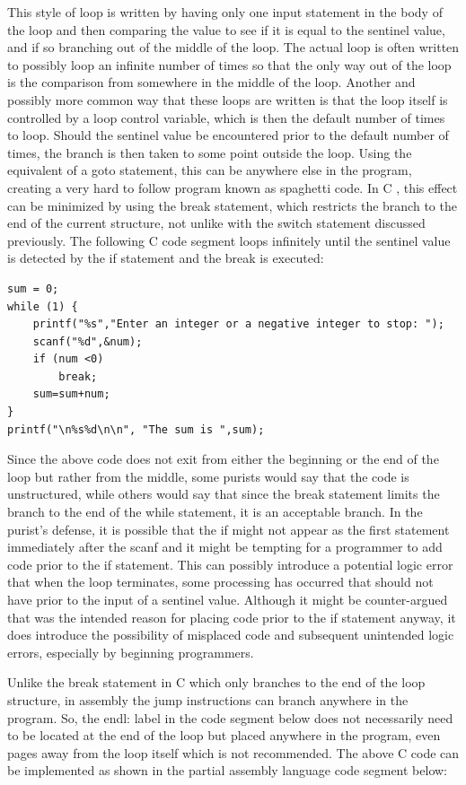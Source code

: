 \documentclass[10pt]{book}
\begin{document}
This style of loop is written by having only one input statement in the body of the loop and then comparing the value to see if it is equal to the sentinel value, and if so branching out of the middle of the loop. The actual loop is often written to possibly loop an infinite number of times so that the only way out of the loop is the comparison from somewhere in the middle of the loop. Another and possibly more common way that these loops are written is that the loop itself is controlled by a loop control variable, which is then the default number of times to loop. Should the sentinel value be encountered prior to the default number of times, the branch is then taken to some point outside the loop. Using the equivalent of a goto statement, this can be anywhere else in the program, creating a very hard to follow program known as spaghetti code. In C , this effect can be minimized by using the break statement, which restricts the branch to the end of the current structure, not unlike with the switch statement discussed previously. The following C code segment loops infinitely until the sentinel value is detected by the if statement and the break is executed:

\begin{verbatim}
sum = 0;
while (1) {
    printf("%s","Enter an integer or a negative integer to stop: ");
    scanf("%d",&num);
    if (num <0)
        break;
    sum=sum+num;
}
printf("\n%s%d\n\n", "The sum is ",sum);
\end{verbatim}

Since the above code does not exit from either the beginning or the end of the loop but rather from the middle, some purists would say that the code is unstructured, while others would say that since the break statement limits the branch to the end of the while statement, it is an acceptable branch. In the purist's defense, it is possible that the if might not appear as the first statement immediately after the scanf and it might be tempting for a programmer to add code prior to the if statement. This can possibly introduce a potential logic error that when the loop terminates, some processing has occurred that should not have prior to the input of a sentinel value. Although it might be counter-argued that was the intended reason for placing code prior to the if statement anyway, it does introduce the possibility of misplaced code and subsequent unintended logic errors, especially by beginning programmers.


Unlike the break statement in C which only branches to the end of the loop structure, in assembly the jump instructions can branch anywhere in the program. So, the endl: label in the code segment below does not necessarily need to be located at the end of the loop but placed anywhere in the program, even pages away from the loop itself which is not recommended. The above C code can be implemented as shown in the partial assembly language code segment below:
\end{document}

